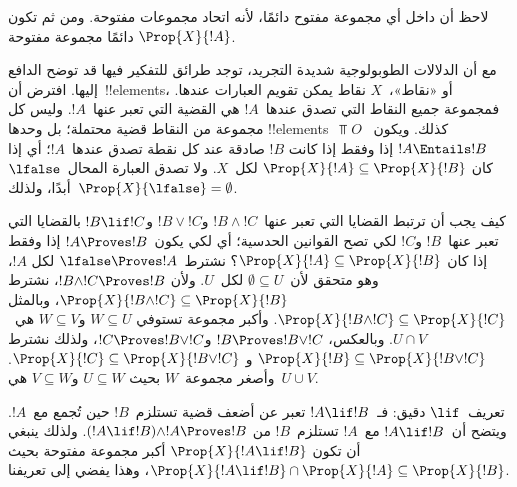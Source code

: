 \documentclass[../../../include/open-logic-section]{subfiles}
\begin{document}
لاحظ أن داخل أي مجموعة مفتوح دائمًا، لأنه اتحاد مجموعات مفتوحة. ومن ثم تكون
$\Prop{X}{!A}$ دائمًا مجموعة مفتوحة.

مع أن الدلالات الطوبولوجية شديدة التجريد، توجد طرائق للتفكير فيها قد توضح
الدافع إليها. افترض أن~!!{element}s، أو «نقاط»،~$X$ نقاط يمكن تقويم
العبارات عندها. فمجموعة جميع النقاط التي تصدق عندها~$!A$ هي القضية التي
تعبر عنها~$!A$. وليس كل مجموعة من النقاط قضية محتملة؛ بل وحدها
!!{element}s~$\Top{O}$ كذلك. ويكون~$!A \Entails !B$ إذا وفقط إذا كانت
$!B$ صادقة عند كل نقطة تصدق عندها~$!A$؛ أي إذا كان
$\Prop{X}{!A}\subseteq\Prop{X}{!B}$ لكل~$X$. ولا تصدق العبارة
المحال~$\lfalse$ أبدًا، ولذلك~$\Prop{X}{\lfalse}=\emptyset$.

كيف يجب أن ترتبط القضايا التي تعبر عنها~$!B \land !C$ و$!B \lor !C$
و$!B \lif !C$ بالقضايا التي تعبر عنها~$!B$ و$!C$ لكي تصح القوانين
الحدسية؛ أي لكي يكون~$!A \Proves !B$ إذا وفقط إذا كان
$\Prop{X}{!A}\subseteq\Prop{X}{!B}$؟ نشترط~$\lfalse \Proves !A$ لكل
$!A$، وهو متحقق لأن~$\emptyset\subseteq U$ لكل~$U$. ولأن
$!B \land !C \Proves !B$، نشترط
$\Prop{X}{!B \land !C}\subseteq\Prop{X}{!B}$، وبالمثل
$\Prop{X}{!B \land !C}\subseteq\Prop{X}{!C}$. وأكبر مجموعة تستوفي
$W \subseteq U$ و$W \subseteq V$ هي~$U \cap V$. وبالعكس،
$!B \Proves !B \lor !C$ و$!C \Proves !B \lor !C$، ولذلك نشترط
$\Prop{X}{!B}\subseteq\Prop{X}{!B \lor !C}$ و
$\Prop{X}{!C}\subseteq\Prop{X}{!B \lor !C}$. وأصغر مجموعة~$W$ بحيث
$U \subseteq W$ و$V \subseteq W$ هي~$U \cup V$.

تعريف~$\lif$ دقيق: فـ~$!A \lif !B$ تعبر عن أضعف قضية تستلزم~$!B$ حين
تُجمع مع~$!A$. ويتضح أن~$!A \lif !B$ مع~$!A$ تستلزم~$!B$ من
$(!A \lif !B)\land !A \Proves !B$. ولذلك ينبغي أن تكون
$\Prop{X}{!A \lif !B}$ أكبر مجموعة مفتوحة بحيث
$\Prop{X}{!A \lif !B}\cap\Prop{X}{!A}\subseteq\Prop{X}{!B}$، وهذا
يفضي إلى تعريفنا.
\end{document}
